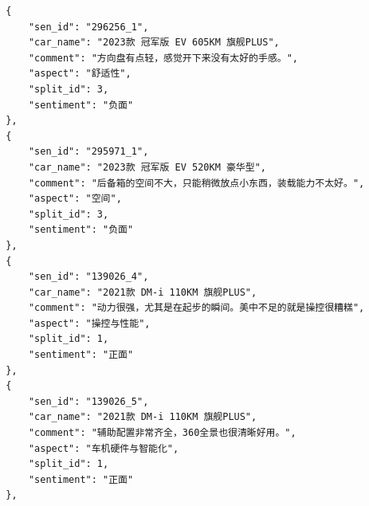 \documentclass[UTF8,a4paper,15pt,titlepage,oneside]{ctexbook}
\begin{document}
\begin{mdframed}[backgroundcolor=lightgray!20, linecolor=darkgray, linewidth=1pt]
  \begin{verbatim}
  {
      "sen_id": "296256_1",
      "car_name": "2023款 冠军版 EV 605KM 旗舰PLUS",
      "comment": "方向盘有点轻，感觉开下来没有太好的手感。",
      "aspect": "舒适性",
      "split_id": 3,
      "sentiment": "负面"
  },
  {
      "sen_id": "295971_1",
      "car_name": "2023款 冠军版 EV 520KM 豪华型",
      "comment": "后备箱的空间不大，只能稍微放点小东西，装载能力不太好。",
      "aspect": "空间",
      "split_id": 3,
      "sentiment": "负面"
  },
  {
      "sen_id": "139026_4",
      "car_name": "2021款 DM-i 110KM 旗舰PLUS",
      "comment": "动力很强，尤其是在起步的瞬间。美中不足的就是操控很糟糕",
      "aspect": "操控与性能",
      "split_id": 1,
      "sentiment": "正面"
  },
  {
      "sen_id": "139026_5",
      "car_name": "2021款 DM-i 110KM 旗舰PLUS",
      "comment": "辅助配置非常齐全，360全景也很清晰好用。",
      "aspect": "车机硬件与智能化",
      "split_id": 1,
      "sentiment": "正面"
  },
\end{verbatim}
  \end{mdframed}
    
\end{document}
